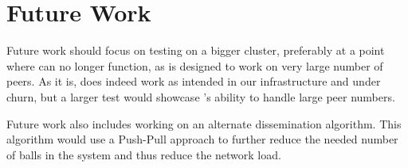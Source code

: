 \section{Future Work}
\label{sec:future-work}
Future work should focus on testing \epto on a bigger cluster, preferably at a point where \jgroups can no longer function, as \epto is designed to work on very large number of peers. As it is, \epto does indeed work as intended in our infrastructure and under churn, but a larger test would showcase \epto's ability to handle large peer numbers.
\par
Future work also includes working on an alternate \epto dissemination algorithm. This algorithm would use a Push-Pull approach to further reduce the needed number of balls in the system and thus reduce the network load.